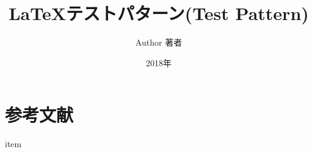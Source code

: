 \documentclass[uplatex,a4paper,11pt]{jsarticle}
\title{\LaTeX テストパターン(Test Pattern)}
\author{Author 著者}
\date{2018年}
\begin{document}
\setlength{\abovedisplayskip}{-7pt}
\setlength{\belowdisplayskip}{5pt}
\maketitle


\section{参考文献}\vspace{-3zh}
\begin{thebibliography}{99}
 item
\end{thebibliography}
\end{document}
